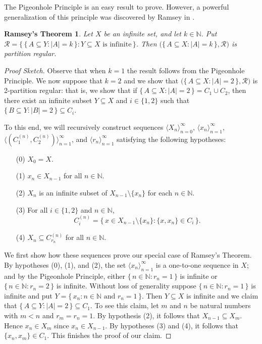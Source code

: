 \documentclass[12pt]{article}
\theoremstyle{plain}
\newtheorem*{ramsey}{Ramsey's Theorem}
\theoremstyle{definition}
\newcommand{\la}{\langle}
\newcommand{\ra}{\rangle}
\newcommand{\bbN}{\mathbb{N}}
\newcommand{\calR}{\mathcal{R}}
\begin{document}
The Pigeonhole Principle is an easy result to prove. 
However, a powerful generalization of this principle was discovered by
Ramsey in \cite[Theorem A]{Ramsey:1930uq}. 

\begin{ramsey}
  Let $X$ be an infinite set, and let $k \in \bbN$.
  Put $\calR = \bigl\{\, \{\, A \subseteq Y : |A| = k \,\} : \mbox{$Y
    \subseteq X$ is infinite} \,\bigr\}$.
  Then $\bigl(\{\, A \subseteq X : |A| = k \,\}, \calR\bigr)$ is
  partition regular. 
\end{ramsey}
\begin{proof}[Proof Sketch]
  Observe that when $k = 1$ the result follows from the Pigeonhole
  Principle. 
  We now suppose that $k=2$ and we show that $\bigl(\{\, A
  \subseteq X : |A| = 2 \,\}, \calR\bigr)$ is \mbox{2-partition}
  regular: that is, we show that if $\{\, A \subseteq X : |A| = 2 \,\}
  = C_1 \cup C_2$, then there exist an infinite subset $Y \subseteq
  X$ and $i \in \{1, 2\}$ such that $\{\, B \subseteq Y : |B| = 2 \,\}
  \subseteq C_i$. 

  To this end, we will recursively construct sequences $\la X_n
  \ra_{n=0}^\infty$, $\la x_n \ra_{n=1}^\infty$, $\bigl\la (C_1^{(n)},
  C_2^{(n)}) \bigr\ra_{n=1}^\infty$, and $\la r_n \ra_{n=1}^\infty$
  satisfying the following hypotheses:
  \begin{itemize}
    \item[(0)] $X_0 = X$.
    \item[(1)] $x_n \in X_{n-1}$ for all $n \in \bbN$.
    \item[(2)] $X_n$ is an infinite subset of $X_{n-1} \setminus
      \{x_n\}$ for each $n \in \bbN$.
    \item[(3)] For all $i \in \{1, 2\}$ and $n \in \bbN$, 
      \[
        C_i^{(n)} = \{\, x \in X_{n-1} \setminus \{x_n\} : \{x, x_n\}
        \in C_i \,\}.
      \]
    \item[(4)] $X_n \subseteq C_{r_n}^{(n)}$ for all $n \in \bbN$. 
  \end{itemize}
  We first show how these sequences prove our special case of Ramsey's
  Theorem. 
  By hypotheses (0), (1), and (2), the set $\la x_n \ra_{n=1}^\infty$
  is a one-to-one sequence in $X$; and by the Pigeonhole Principle,
  either $\{\, n \in \bbN : r_n = 1 \,\}$ is infinite or $\{\, n \in
  \bbN : r_n = 2 \,\}$ is infinite. 
  Without loss of generality suppose $\{\, n \in \bbN : r_n = 1 \,\}$
  is infinite and put $Y = \{\, x_n : \mbox{$n \in \bbN$ and $r_n =
    1$} \,\}$.
  Then $Y \subseteq X$ is infinite and we claim that $\{\, A \subseteq
  Y : |A| = 2\,\} \subseteq C_1$.
  To see this claim, let $m$ and $n$ be natural numbers with $m < n$
  and $r_m = r_n = 1$. 
  By hypothesis (2), it follows that $X_{n-1} \subseteq X_m$. 
  Hence $x_n \in X_m$ since $x_n \in X_{n-1}$. 
  By hypotheses (3) and (4), it follows that $\{x_n , x_m \} \in
  C_1$. 
  This finishes the proof of our claim.


\end{proof}
\end{document}
